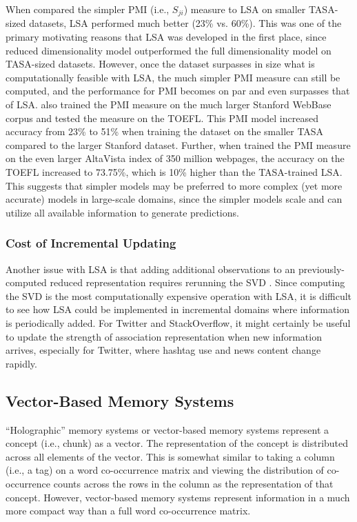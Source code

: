 \documentclass[man,floatsintext,donotrepeattitle]{apa6}
\begin{document}
When \textcite{Budiu2007} compared the simpler PMI (i.e., $S_{ji}$) measure to LSA on smaller TASA-sized datasets, LSA performed much better (23\% vs. 60\%).
This was one of the primary motivating reasons that LSA was developed in the first place, since reduced dimensionality model outperformed the full dimensionality model on TASA-sized datasets.
However, once the dataset surpasses in size what is computationally feasible with LSA, the much simpler PMI measure can still be computed, and the performance for PMI becomes on par and even surpasses that of LSA.
\textcite{Budiu2007} also trained the PMI measure on the much larger Stanford WebBase corpus and tested the measure on the TOEFL.
This PMI model increased accuracy from 23\% to 51\% when training the dataset on the smaller TASA compared to the larger Stanford dataset.
Further, when \textcite{Turney2001} trained the PMI measure on the even larger AltaVista index of 350 million webpages, the accuracy on the TOEFL increased to \num{73.75}\%, which is 10\% higher than the TASA-trained LSA.
This suggests that simpler models may be preferred to more complex (yet more accurate) models in large-scale domains, since the simpler models scale and can utilize all available information to generate predictions.

\subsubsection{Cost of Incremental Updating}

Another issue with LSA is that adding additional observations to an previously-computed reduced representation requires rerunning the SVD \parencite{Farahat2004}.
Since computing the SVD is the most computationally expensive operation with LSA, it is difficult to see how LSA could be implemented in incremental domains where information is periodically added.
For Twitter and StackOverflow, it might certainly be useful to update the strength of association representation when new information arrives, especially for Twitter, where hashtag use and news content change rapidly.

\subsection{Vector-Based Memory Systems}

``Holographic'' memory systems \parencite{Plate1995} or vector-based memory systems represent a concept (i.e., chunk) as a vector.
The representation of the concept is distributed across all elements of the vector.
This is somewhat similar to taking a column (i.e., a tag) on a word co-occurrence matrix and viewing the distribution of co-occurrence counts across the rows in the column as the representation of that concept.
However, vector-based memory systems represent information in a much more compact way than a full word co-occurrence matrix.
\end{document}
